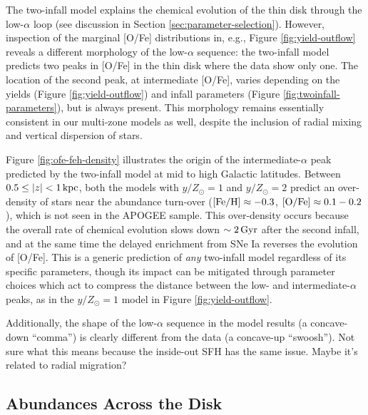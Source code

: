 \documentclass[twocolumn,twocolappendix,linenumbers]{aastex631}
\newcommand{\mathFeH}{{\rm [Fe/H]}}
\newcommand{\mathOFe}{{\rm [O/Fe]}}
\newcommand{\todo}[1]{{\color{red}#1}}
\begin{document}
The two-infall model explains the chemical evolution of the thin disk through the low-$\alpha$ loop (see discussion in Section \ref{sec:parameter-selection}). However, inspection of the marginal [O/Fe] distributions in, e.g., Figure \ref{fig:yield-outflow} reveals a different morphology of the low-$\alpha$ sequence: the two-infall model predicts two peaks in [O/Fe] in the thin disk where the data show only one. The location of the second peak, at intermediate [O/Fe], varies depending on the yields (Figure \ref{fig:yield-outflow}) and infall parameters (Figure \ref{fig:twoinfall-parameters}), but is always present. This morphology remains essentially consistent in our multi-zone models as well, despite the inclusion of radial mixing and vertical dispersion of stars.

Figure \ref{fig:ofe-feh-density} illustrates the origin of the intermediate-$\alpha$ peak predicted by the two-infall model at mid to high Galactic latitudes. Between $0.5\leq|z|<1\,{\rm kpc}$, both the models with $y/Z_\odot=1$ and $y/Z_\odot=2$ predict an over-density of stars near the abundance turn-over ($\mathFeH\approx-0.3$, $\mathOFe\approx0.1-0.2$), which is not seen in the APOGEE sample. This over-density occurs because the overall rate of chemical evolution slows down $\sim2\,{\rm Gyr}$ after the second infall, and at the same time the delayed enrichment from SNe Ia reverses the evolution of [O/Fe]. This is a generic prediction of {\it any} two-infall model regardless of its specific parameters, though its impact can be mitigated through parameter choices which act to compress the distance between the low- and intermediate-$\alpha$ peaks, as in the $y/Z_\odot=1$ model in Figure \ref{fig:yield-outflow}.

Additionally, the shape of the low-$\alpha$ sequence in the model results (a concave-down ``comma'') is clearly different from the data (a concave-up ``swoosh''). \todo{Not sure what this means because the inside-out SFH has the same issue. Maybe it's related to radial migration?}

\subsection{Abundances Across the Disk}
\label{sec:disk-abundances}
\end{document}
